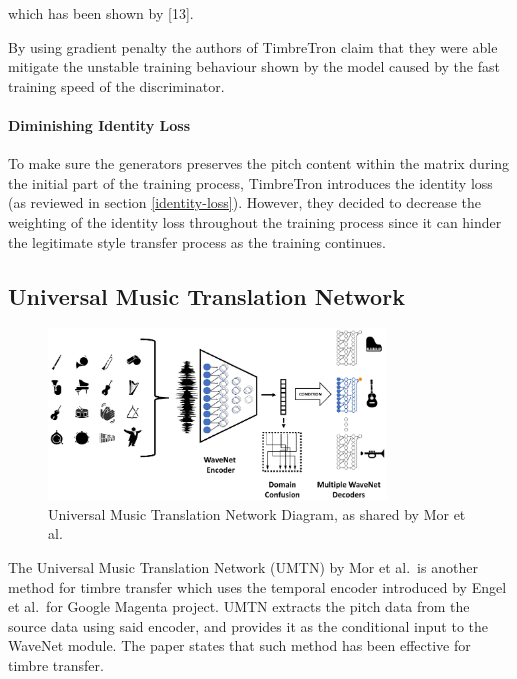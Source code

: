 \documentclass[12pt,a4paper,]{report}
\begin{document}
which has been shown by {[}13{]}.

By using gradient penalty the authors of TimbreTron claim that they were
able mitigate the unstable training behaviour shown by the model caused
by the fast training speed of the discriminator.

\paragraph{Diminishing Identity Loss}

To make sure the generators preserves the pitch content within the
matrix during the initial part of the training process, TimbreTron
introduces the identity loss (as reviewed in section
\ref{identity-loss}). However, they decided to decrease the weighting of
the identity loss throughout the training process since it can hinder
the legitimate style transfer process as the training continues.

\hypertarget{universal-music-translation-network}{%
\subsection{Universal Music Translation
Network}\label{universal-music-translation-network}}

\begin{figure}[h]
    \includegraphics[width=0.8\textwidth]{figures/facebook_umtn.eps}
    \centering
    \caption[Universal Music Translation Network Diagram]{Universal Music Translation Network Diagram, as shared by Mor et al. \label{fig:facebook_umtn}}
\end{figure}

The Universal Music Translation Network (UMTN) by Mor et al.~is another
method for timbre transfer which uses the temporal encoder introduced by
Engel et al.~for Google Magenta project. UMTN extracts the pitch data
from the source data using said encoder, and provides it as the
conditional input to the WaveNet module. The paper states that such
method has been effective for timbre transfer.
\end{document}
